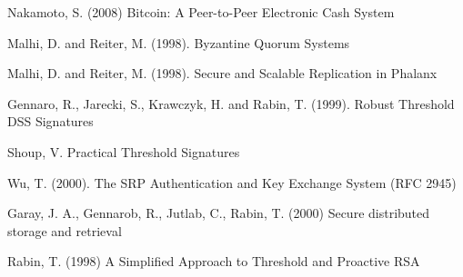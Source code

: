 \begin{thebibliography}{99}

  Nakamoto, S. (2008) Bitcoin: A Peer-to-Peer Electronic Cash System

  Malhi, D. and Reiter, M. (1998). Byzantine Quorum Systems

  Malhi, D. and Reiter, M. (1998). Secure and Scalable Replication in Phalanx

  Gennaro, R., Jarecki, S., Krawczyk, H. and Rabin, T. (1999). Robust
  Threshold DSS Signatures

  Shoup, V. Practical Threshold Signatures
  
  Wu, T. (2000). The SRP Authentication and Key Exchange System (RFC
  2945)

  Garay, J. A., Gennarob, R., Jutlab, C., Rabin, T. (2000)  Secure
  distributed storage and retrieval

  Rabin, T. (1998) A Simplified Approach to Threshold and Proactive RSA

\end{thebibliography}
